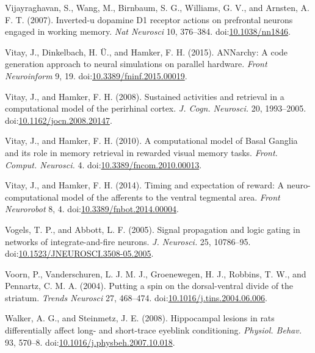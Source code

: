\documentclass[
  11pt,
  a4paper,
]{scrbook}
\newlength{\cslhangindent}
\newenvironment{CSLReferences}[2] %
 {\begin{list}{}{%
  \setlength{\itemindent}{0pt}
  \setlength{\leftmargin}{0pt}
  \setlength{\parsep}{0pt}
  \ifodd #1
   \setlength{\leftmargin}{\cslhangindent}
   \setlength{\itemindent}{-1\cslhangindent}
  \fi
  \setlength{\itemsep}{#2\baselineskip}}}
 {\end{list}}
\begin{document}
\begin{CSLReferences}{1}{1}
Vijayraghavan, S., Wang, M., Birnbaum, S. G., Williams, G. V., and
Arnsten, A. F. T. (2007). Inverted-u dopamine D1 receptor actions on
prefrontal neurons engaged in working memory. \emph{Nat Neurosci} 10,
376--384. doi:\href{https://doi.org/10.1038/nn1846}{10.1038/nn1846}.

Vitay, J., Dinkelbach, H. Ü., and Hamker, F. H. (2015). ANNarchy: A code
generation approach to neural simulations on parallel hardware.
\emph{Front Neuroinform} 9, 19.
doi:\href{https://doi.org/10.3389/fninf.2015.00019}{10.3389/fninf.2015.00019}.

Vitay, J., and Hamker, F. H. (2008). {Sustained activities and retrieval
in a computational model of the perirhinal cortex.} \emph{J. Cogn.
Neurosci.} 20, 1993--2005.
doi:\href{https://doi.org/10.1162/jocn.2008.20147}{10.1162/jocn.2008.20147}.

Vitay, J., and Hamker, F. H. (2010). {A computational model of Basal
Ganglia and its role in memory retrieval in rewarded visual memory
tasks.} \emph{Front. Comput. Neurosci.} 4.
doi:\href{https://doi.org/10.3389/fncom.2010.00013}{10.3389/fncom.2010.00013}.

Vitay, J., and Hamker, F. H. (2014). Timing and expectation of reward: A
neuro-computational model of the afferents to the ventral tegmental
area. \emph{Front Neurorobot} 8, 4.
doi:\href{https://doi.org/10.3389/fnbot.2014.00004}{10.3389/fnbot.2014.00004}.

Vogels, T. P., and Abbott, L. F. (2005). {Signal propagation and logic
gating in networks of integrate-and-fire neurons.} \emph{J. Neurosci.}
25, 10786--95.
doi:\href{https://doi.org/10.1523/JNEUROSCI.3508-05.2005}{10.1523/JNEUROSCI.3508-05.2005}.

Voorn, P., Vanderschuren, L. J. M. J., Groenewegen, H. J., Robbins, T.
W., and Pennartz, C. M. A. (2004). Putting a spin on the dorsal-ventral
divide of the striatum. \emph{Trends Neurosci} 27, 468--474.
doi:\href{https://doi.org/10.1016/j.tins.2004.06.006}{10.1016/j.tins.2004.06.006}.

Walker, A. G., and Steinmetz, J. E. (2008). {Hippocampal lesions in rats
differentially affect long- and short-trace eyeblink conditioning.}
\emph{Physiol. Behav.} 93, 570--8.
doi:\href{https://doi.org/10.1016/j.physbeh.2007.10.018}{10.1016/j.physbeh.2007.10.018}.


\end{CSLReferences}
\end{document}
